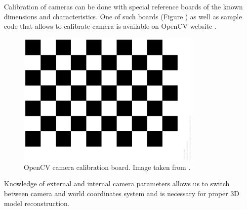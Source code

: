Calibration of cameras can be done with special reference boards of the known dimensions and characteristics. One of such boards (Figure ) as well as sample code that allows to calibrate camera is available on OpenCV website \cite{website:cameraCalibration}.
\begin{figure}[h!]
    \centering
    \includegraphics[width=0.8\textwidth]{opencv_camera_calib}
    \caption{OpenCV camera calibration board. Image taken from \cite{website:cameraCalibration}.}
    \label{fig:camera_model}
\end{figure}
Knowledge of external and internal camera parameters allows us to switch between camera and world coordinates system and is necessary for proper 3D model reconstruction.
